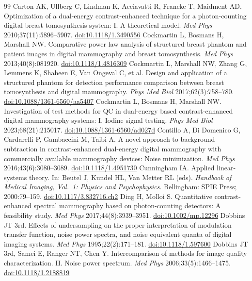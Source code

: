 \documentclass[11pt,a4paper]{article}
\begin{document}
\begin{thebibliography}{99}
 Carton AK, Ullberg C, Lindman K, Acciavatti R, Francke T, Maidment AD. Optimization of a dual-energy contrast-enhanced technique for a photon-counting digital breast tomosynthesis system: I. A theoretical model. \emph{Med Phys} 2010;37(11):5896--5907. \href{https://doi.org/10.1118/1.3490556}{doi:10.1118/1.3490556}
 Cockmartin L, Bosmans H, Marshall NW. Comparative power law analysis of structured breast phantom and patient images in digital mammography and breast tomosynthesis. \emph{Med Phys} 2013;40(8):081920. \href{https://doi.org/10.1118/1.4816309}{doi:10.1118/1.4816309}
 Cockmartin L, Marshall NW, Zhang G, Lemmens K, Shaheen E, Van Ongeval C, et al. Design and application of a structured phantom for detection performance comparison between breast tomosynthesis and digital mammography. \emph{Phys Med Biol} 2017;62(3):758--780. \href{https://doi.org/10.1088/1361-6560/aa5407}{doi:10.1088/1361-6560/aa5407}
 Cockmartin L, Bosmans H, Marshall NW. Investigation of test methods for QC in dual-energy based contrast-enhanced digital mammography systems: I. Iodine signal testing. \emph{Phys Med Biol} 2023;68(21):215017. \href{https://doi.org/10.1088/1361-6560/ad027d}{doi:10.1088/1361-6560/ad027d}
 Contillo A, Di Domenico G, Cardarelli P, Gambaccini M, Taibi A. A novel approach to background subtraction in contrast-enhanced dual-energy digital mammography with commercially available mammography devices: Noise minimization. \emph{Med Phys} 2016;43(6):3080--3089. \href{https://doi.org/10.1118/1.4951730}{doi:10.1118/1.4951730}
 Cunningham IA. Applied linear-systems theory. In: Beutel J, Kundel HL, Van Metter RL (eds). \emph{Handbook of Medical Imaging, Vol.~1: Physics and Psychophysics}. Bellingham: SPIE Press; 2000:79--159. \href{https://doi.org/10.1117/3.832716.ch2}{doi:10.1117/3.832716.ch2}
 Ding H, Molloi S. Quantitative contrast-enhanced spectral mammography based on photon-counting detectors: A feasibility study. \emph{Med Phys} 2017;44(8):3939--3951. \href{https://doi.org/10.1002/mp.12296}{doi:10.1002/mp.12296}
 Dobbins JT 3rd. Effects of undersampling on the proper interpretation of modulation transfer function, noise power spectra, and noise equivalent quanta of digital imaging systems. \emph{Med Phys} 1995;22(2):171--181. \href{https://doi.org/10.1118/1.597600}{doi:10.1118/1.597600}
 Dobbins JT 3rd, Samei E, Ranger NT, Chen Y. Intercomparison of methods for image quality characterization. II. Noise power spectrum. \emph{Med Phys} 2006;33(5):1466--1475. \href{https://doi.org/10.1118/1.2188819}{doi:10.1118/1.2188819}

\end{thebibliography}
\end{document}
